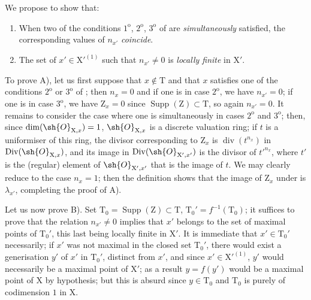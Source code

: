 \begin{env}[21.10.2]
\label{IV.21.10.2}
We propose to show that:
\begin{enumerate}[label=\emph{\Alph*)}]
  \item When two of the conditions $1^{\mathrm{o}}$, $2^{\mathrm{o}}$, $3^{\mathrm{o}}$ of  are \emph{simultaneously} satisfied, the corresponding values of $n_{x'}$ \emph{coincide}.
  \item The set of $x'\in\mathrm{X}'^{(1)}$ such that $n_{x'}\neq 0$ is \emph{locally finite} in $\mathrm{X}'$.
\end{enumerate}

To prove A), let us first suppose that $x\notin\mathrm{T}$ and that $x$ satisfies one of the conditions $2^{\mathrm{o}}$ or $3^{\mathrm{o}}$ of ; then $n_x=0$ and if one is in case $2^{\mathrm{o}}$, we have $n_{x'}=0$; if one is in case $3^{\mathrm{o}}$, we have $\mathrm{Z}_x=0$ since $\operatorname{Supp}(\mathrm{Z})\subset\mathrm{T}$, so again $n_{x'}=0$.
It remains to consider the case where one is simultaneously in cases $2^{\mathrm{o}}$ and $3^{\mathrm{o}}$; then, since $\dim(\sh{O}_{\mathrm{X},x})=1$, $\sh{O}_{\mathrm{X},x}$ is a discrete valuation ring; if $t$ is a uniformiser of this ring, the divisor corresponding to $\mathrm{Z}_x$ is $\operatorname{div}(t^{n_x})$ in $\operatorname{Div}(\sh{O}_{\mathrm{X},x})$, and its image in $\operatorname{Div}(\sh{O}_{\mathrm{X}',x'})$ is the divisor of $t'^{n_x}$, where $t'$ is the (regular) element of $\sh{O}_{\mathrm{X}',x'}$ that is the image of $t$.
We may clearly reduce to the case $n_x=1$; then the definition  shows that the image of $\mathrm{Z}_x$ under  is $\lambda_{x'}$, completing the proof of A).

Let us now prove B).
Set $\mathrm{T}_0=\operatorname{Supp}(\mathrm{Z})\subset\mathrm{T}$, $\mathrm{T}_0'=f^{-1}(\mathrm{T}_0)$; it suffices to prove that the relation $n_{x'}\neq 0$ implies that $x'$ belongs to the set of maximal points of $\mathrm{T}_0'$, this last being locally finite in $\mathrm{X}'$.
It is immediate that $x'\in\mathrm{T}_0'$ necessarily; if $x'$ was not maximal in the closed set $\mathrm{T}_0'$, there would exist
a generisation $y'$ of $x'$ in $\mathrm{T}_0'$, distinct from $x'$, and since $x'\in\mathrm{X}'^{(1)}$, $y'$ would necessarily be a maximal point of $\mathrm{X}'$; as a result $y=f(y')$ would be a maximal point of $\mathrm{X}$ by hypothesis; but this is absurd since $y\in\mathrm{T}_0$ and $\mathrm{T}_0$ is purely of codimension $1$ in $\mathrm{X}$.
\end{env}

